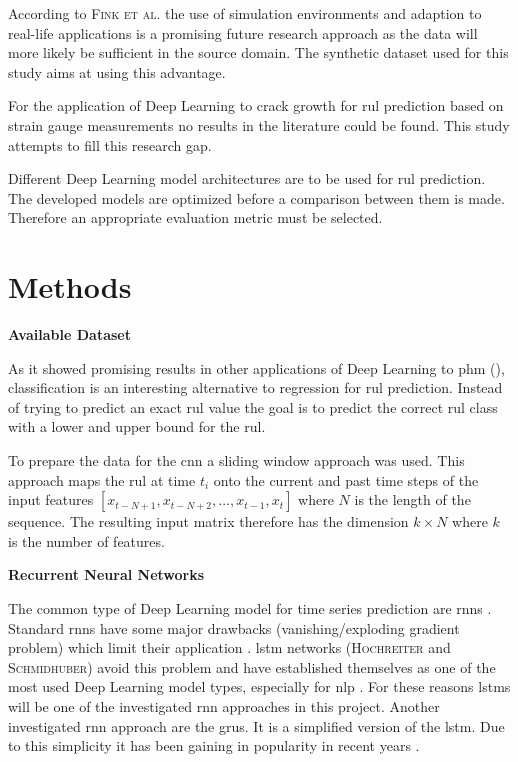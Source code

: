 \documentclass[conference]{IEEEtran}
\begin{document}
According to \textsc{Fink et al.} \cite{Fink2020} the use of simulation environments and adaption to real-life applications is a promising future research approach as the data will more likely be sufficient in the source domain. The synthetic dataset used for this study aims at using this advantage.

For the application of Deep Learning to crack growth for \gls{rul} prediction based on strain gauge measurements no results in the literature could be found. This study attempts to fill this research gap.


Different Deep Learning model architectures are to be used for \gls{rul} prediction. The developed models are optimized before a comparison between them is made. Therefore an appropriate evaluation metric must be selected.


\section{Methods}
\label{sec:methods}


\noindent
\textbf{Available Dataset}


As it showed promising results in other applications of Deep Learning to \gls{phm} (\cite{Liu2019a, Xiao2016}), classification is an interesting alternative to regression for \gls{rul} prediction. Instead of trying to predict an exact \gls{rul} value the goal is to predict the correct \gls{rul} class with a lower and upper bound for the \gls{rul}.

To prepare the data for the \gls{cnn} a sliding window approach was used. This approach maps the \gls{rul} at time $ t_i $ onto the current and past time steps of the input features $ [x_{t-N+1}, x_{t-N+2},..., x_{t-1}, x_t] $ where $ N $ is the length of the sequence. The resulting input matrix therefore has the dimension $ k \times N $ where $ k $ is the number of features.


\noindent
\textbf{Recurrent Neural Networks}

The common type of Deep Learning model for time series prediction are \glspl{rnn} \cite{Bai2018}. Standard \glspl{rnn} have some major drawbacks (vanishing/exploding gradient problem) which limit their application \cite{Bengio1994}. \gls{lstm} networks (\textsc{Hochreiter} and \textsc{Schmidhuber}) \cite{Hochreiter1997} avoid this problem and have established themselves as one of the most used Deep Learning model types, especially for \gls{nlp} \cite{Wu2016}. For these reasons \glspl{lstm} will be one of the investigated \gls{rnn} approaches in this project. Another investigated \gls{rnn} approach are the \glspl{gru}. It is a simplified version of the \gls{lstm}. Due to this simplicity it has been gaining in popularity in recent years \cite{Rana2016}. 
\end{document}
